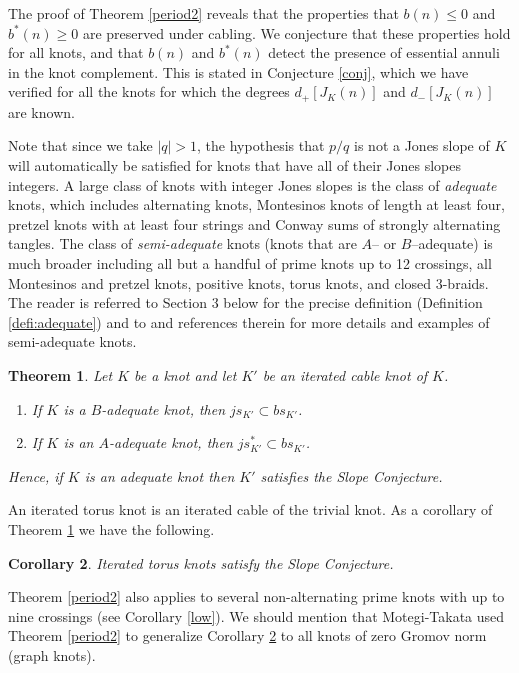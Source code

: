 \documentclass[11pt]{amsart}
\newtheorem{theorem}{Theorem}[section]
\newtheorem{corollary}[theorem]{Corollary}
\theoremstyle{definition}
\newcommand{\abs}[1]{{\left\vert #1 \right\vert}}
\begin{document}
The proof of Theorem \ref{period2} reveals that the properties that
 $b(n) \le 0$ and $b^*(n) \ge 0$ are preserved under cabling. We conjecture that these properties hold for all knots,
and that   $b(n)$ and $b^*(n)$  detect the presence of essential annuli in the knot complement.  This is stated in Conjecture
\ref{conj}, which we have verified for all the knots for which the degrees $d_+[J_K(n)]$ and $d_-[J_K(n)]$
are known.


Note that since we take  $\abs{q}>1$, the hypothesis that $p/q$  is not a Jones slope of $K$ will automatically be satisfied  for knots that have all of their Jones slopes
 integers.
A large class of knots with integer Jones slopes is the class of \emph{adequate} knots, which
includes alternating knots, Montesinos knots of length at least four,  pretzel knots with at least four strings
and Conway sums of strongly alternating tangles. The class of \emph{semi-adequate} knots (knots that are
$A$-- or  $B$--adequate) is much broader including all but a handful of prime knots up to 12 crossings, all Montesinos and pretzel knots, positive knots, torus knots, and closed 3-braids. 
The reader is referred to Section 3 below for the precise definition (Definition \ref{defi:adequate}) and to  \cite{fkp:survey, FKP-guts, FKP-semi, adam} and references therein
for more details and examples of semi-adequate knots.



\begin{theorem}
\label{main:js} Let $K$ be a knot and let  $K'$ be an iterated cable knot of $K$. 
\begin{enumerate}
\item If $K$ is a $B$-adequate knot, then $js_{K'} \subset bs_{K'}$.

\item If $K$ is an $A$-adequate knot, then $js^*_{K'} \subset bs_{K'}$.
\end{enumerate}
Hence, if $K$ is an adequate knot then $K'$ satisfies the Slope Conjecture.
\end{theorem}

An iterated torus knot is an iterated cable of the trivial knot.  As a corollary of Theorem \ref{main:js} we have the following.
\begin{corollary} \label{torusi}
Iterated torus knots satisfy the Slope Conjecture. 
\end{corollary}


 
Theorem \ref{period2} also  applies to several non-alternating  prime knots with up to nine crossings
(see Corollary \ref{low}). We should mention that Motegi-Takata \cite{MoTa} used Theorem  \ref{period2}
to  generalize Corollary \ref{torusi} to all  knots of zero Gromov norm (graph knots).
\end{document}

